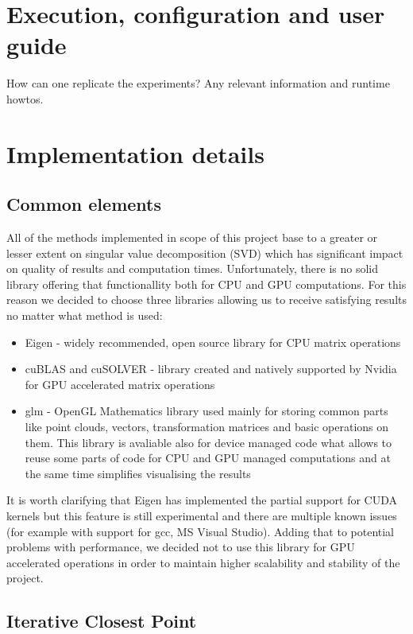 \documentclass[titlepage]{article}
\begin{document}
\section{Execution, configuration and user guide}
How can one replicate the experiments?
Any relevant information and runtime howtos.

\section{Implementation details}
\subsection{Common elements}
All of the methods implemented in scope of this project base to a greater or lesser extent on singular value decomposition (SVD) which has significant impact on quality of results and computation times. Unfortunately, there is no solid library offering that functionallity both for CPU and GPU computations. For this reason we decided to choose three libraries allowing us to receive satisfying results no matter what method is used:
\begin{itemize}
\item Eigen - widely recommended, open source library for CPU matrix operations
\item cuBLAS and cuSOLVER - library created and natively supported by Nvidia for GPU accelerated matrix operations
\item glm - OpenGL Mathematics library used mainly for storing common parts like point clouds, vectors, transformation matrices and basic operations on them. This library is avaliable also for device managed code what allows to reuse some parts of code for CPU and GPU managed computations and at the same time simplifies visualising the results
\end{itemize}
It is worth clarifying that Eigen has implemented the partial support for CUDA kernels but this feature is still experimental and there are multiple known issues (for example with support for gcc, MS Visual Studio). Adding that to potential problems with performance, we decided not to use this library for GPU accelerated operations in order to maintain higher scalability and stability of the project.

\subsection{Iterative Closest Point}
\end{document}
